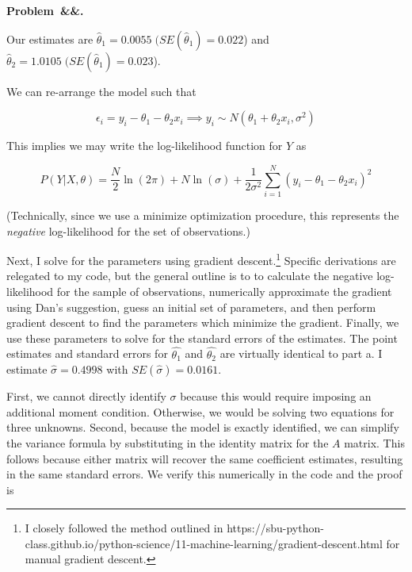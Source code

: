 \documentclass[12pt]{article}
\newcounter{problem}
\newenvironment{problem}[1][]{
    \newpage %
    \refstepcounter{problem}\par\noindent
    \textbf{Problem~\theproblem\ifx&#1&\else.~#1\fi}\rmfamily\par\vspace{0.5em}
}{\vspace{1em}}
\begin{document}
\fancyhf{} %
\vspace{1em}

\begin{problem}

\begin{subproblems}
    \item Our estimates are $\hat{\theta}_1 = 0.0055 \; (SE(\hat{\theta}_1) = 0.022$) and $\hat{\theta}_2 = 1.0105 \; (SE(\hat{\theta}_1) = 0.023$). 

    \item We can re-arrange the model such that 

    $$\epsilon_i = y_i - \theta_1 - \theta_2 x_i \implies y_i \sim N(\theta_1 + \theta_2 x_i, \sigma^2)$$

    This implies we may write the log-likelihood function for $Y$ as

    $$P(Y | X, \theta) = \frac{N}{2}\ln(2\pi) + N\ln(\sigma) + \frac{1}{2\sigma^2}\sum_{i=1}^{N}(y_i - \theta_1 - \theta_2 x_i)^2$$

    (Technically, since we use a minimize optimization procedure, this represents the \emph{negative} log-likelihood for the set of observations.) 

    Next, I solve for the parameters using gradient descent.\footnote{I closely followed the method outlined in https://sbu-python-class.github.io/python-science/11-machine-learning/gradient-descent.html for manual gradient descent.} Specific derivations are relegated to my code, but the general outline is to to calculate the negative log-likelihood for the sample of observations, numerically approximate the gradient using Dan's suggestion, guess an initial set of parameters, and then perform gradient descent to find the parameters which minimize the gradient. Finally, we use these parameters to solve for the standard errors of the estimates. The point estimates and standard errors for $\hat{\theta_1}$ and $\hat{\theta_2}$ are virtually identical to part a. I estimate $\hat{\sigma} = 0.4998$ with $SE(\hat{\sigma}) = 0.0161$. 
    
    \item First, we cannot directly identify $\sigma$ because this would require imposing an additional moment condition. Otherwise, we would be solving two equations for three unknowns. Second, because the model is exactly identified, we can simplify the variance formula by substituting in the identity matrix for the $A$ matrix. This follows because either matrix will recover the same coefficient estimates, resulting in the same standard errors. We verify this numerically in the code and the proof is 


\end{subproblems}
\end{problem}
\end{document}
